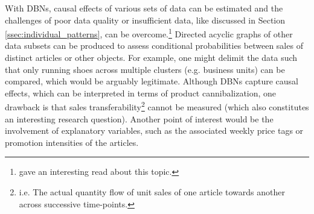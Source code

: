 


With \acp{DBN}, causal effects of various sets of data can be estimated and the challenges of poor data quality or insufficient data, like discussed in Section \ref{ssec:individual_patterns}, can be overcome.\footnote{\cite{bn_advantages} gave an interesting read about this topic.} Directed acyclic graphs of other data subsets can be produced to assess conditional probabilities between sales of distinct articles or other objects. For example, one might delimit the data such that only running shoes across multiple clusters (e.g. business units) can be compared, which would be arguably legitimate. Although \acp{DBN} capture causal effects, which can be interpreted in terms of product cannibalization, one drawback is that sales transferability\footnote{i.e. The actual quantity flow of unit sales of one article towards another across successive time-points.} cannot be measured (which also constitutes an interesting research question). Another point of interest would be the involvement of explanatory variables, such as the associated weekly price tags or promotion intensities of the articles.

